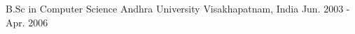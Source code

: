 

\begin{cventries}

  \cventry
    {B.Sc in Computer Science } %
    {Andhra University} %
    {Visakhapatnam, India} %
    {Jun. 2003 - Apr. 2006} %
    {
    }

\end{cventries}
